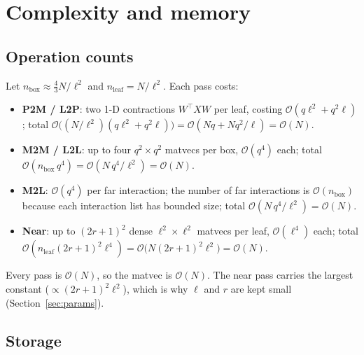 \documentclass[11pt,a4paper]{article}
\newcommand{\Order}{\mathcal{O}}
\theoremstyle{definition}
\theoremstyle{remark}
\begin{document}
\section{Complexity and memory}
\label{sec:complexity}

\subsection{Operation counts}

Let $n_{\text{box}}\approx\tfrac43 N/\ell^2$ and $n_{\text{leaf}}=N/\ell^2$. Each
pass costs:
\begin{itemize}
\item \textbf{P2M / L2P}: two 1-D contractions $W^\top X W$ per leaf, costing
$\Order(q\ell^2 + q^2\ell)$; total $\Order\!\big((N/\ell^2)(q\ell^2+q^2\ell)\big)
= \Order(Nq + Nq^2/\ell)=\Order(N)$.
\item \textbf{M2M / L2L}: up to four $q^2\times q^2$ matvecs per box,
$\Order(q^4)$ each; total $\Order(n_{\text{box}}\,q^4)=\Order(N\,q^4/\ell^2)
=\Order(N)$.
\item \textbf{M2L}: $\Order(q^4)$ per far interaction; the number of far
interactions is $\Order(n_{\text{box}})$ because each interaction list has bounded
size; total $\Order(N\,q^4/\ell^2)=\Order(N)$.
\item \textbf{Near}: up to $(2r+1)^2$ dense $\ell^2\times\ell^2$ matvecs per leaf,
$\Order(\ell^4)$ each; total $\Order(n_{\text{leaf}}(2r+1)^2\ell^4)
=\Order\!\big(N(2r+1)^2\ell^2\big)=\Order(N)$.
\end{itemize}
Every pass is $\Order(N)$, so the matvec is $\Order(N)$. The near pass carries the
largest constant ($\propto (2r+1)^2\ell^2$), which is why $\ell$ and $r$ are kept
small (Section~\ref{sec:params}).

\subsection{Storage}
\end{document}
